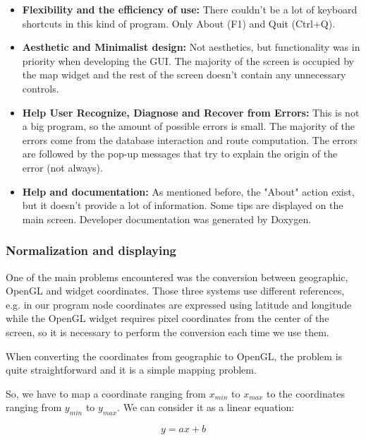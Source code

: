 \documentclass{article}
\begin{document}
\begin{itemize}
	\item \textbf{Flexibility and the efficiency of use: }
	There couldn't be a lot of keyboard shortcuts in this kind of program. Only About (F1) and Quit (Ctrl+Q).
	
	\item \textbf{Aesthetic and Minimalist design: }
	Not aesthetics, but functionality was in priority when developing the GUI. The majority of the screen is occupied by the map widget and the rest of the screen doesn't contain any unnecessary controls.
	
	\item \textbf{Help User Recognize, Diagnose and Recover from Errors: }
	This is not a big program, so the amount of possible errors is small. The majority of the errors come from the database interaction and route computation. The errors are followed by the pop-up messages that try to explain the origin of the error (not always).
	
	\item \textbf{Help and documentation: }
	As mentioned before, the "About" action exist, but it doesn't provide a lot of information. Some tips are displayed on the main screen.
	Developer documentation was generated by Doxygen.
	
\end{itemize}

\subsubsection{Normalization and displaying}

One of the main problems encountered was the conversion between geographic, OpenGL and widget coordinates. Those three systems use different references, e.g. in our program node coordinates are expressed using latitude and longitude while the OpenGL widget requires pixel coordinates from the center of the screen, so it is necessary to perform the conversion each time we use them.

When converting the coordinates from geographic to OpenGL, the problem is quite straightforward and it is a simple mapping problem.

So, we have to map a coordinate ranging from $x_{min}$ to $x_{max}$ to the coordinates ranging from $y_{min}$ to $y_{max}$. We can consider it as a linear equation:

\begin{equation}
y = ax + b
\end{equation}
\end{document}
